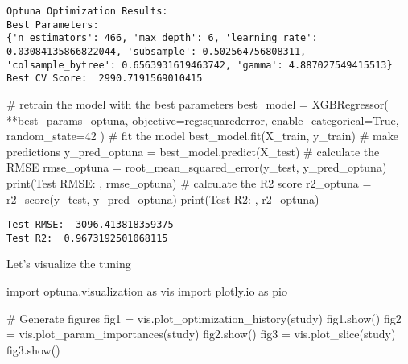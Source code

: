 \documentclass[
  letterpaper,
  DIV=11,
  numbers=noendperiod]{scrreprt}
\newenvironment{Shaded}{\begin{snugshade}}{\end{snugshade}}
\newcommand{\BuiltInTok}[1]{\textcolor[rgb]{0.00,0.23,0.31}{#1}}
\newcommand{\CommentTok}[1]{\textcolor[rgb]{0.37,0.37,0.37}{#1}}
\newcommand{\DecValTok}[1]{\textcolor[rgb]{0.68,0.00,0.00}{#1}}
\newcommand{\ImportTok}[1]{\textcolor[rgb]{0.00,0.46,0.62}{#1}}
\newcommand{\NormalTok}[1]{\textcolor[rgb]{0.00,0.23,0.31}{#1}}
\newcommand{\OperatorTok}[1]{\textcolor[rgb]{0.37,0.37,0.37}{#1}}
\newcommand{\StringTok}[1]{\textcolor[rgb]{0.13,0.47,0.30}{#1}}
\newcommand{\VariableTok}[1]{\textcolor[rgb]{0.07,0.07,0.07}{#1}}
\begin{document}
\begin{verbatim}
Optuna Optimization Results: 
Best Parameters: 
{'n_estimators': 466, 'max_depth': 6, 'learning_rate': 0.03084135866822044, 'subsample': 0.502564756808311, 'colsample_bytree': 0.6563931619463742, 'gamma': 4.887027549415513}
Best CV Score:  2990.7191569010415
\end{verbatim}

\begin{Shaded}
\begin{Highlighting}[]
\CommentTok{\# retrain the model with the best parameters}
\NormalTok{best\_model }\OperatorTok{=}\NormalTok{ XGBRegressor(}
    \OperatorTok{**}\NormalTok{best\_params\_optuna,}
\NormalTok{    objective}\OperatorTok{=}\StringTok{\textquotesingle{}reg:squarederror\textquotesingle{}}\NormalTok{,}
\NormalTok{    enable\_categorical}\OperatorTok{=}\VariableTok{True}\NormalTok{,}
\NormalTok{    random\_state}\OperatorTok{=}\DecValTok{42}
\NormalTok{)}
\CommentTok{\# fit the model}
\NormalTok{best\_model.fit(X\_train, y\_train)}
\CommentTok{\# make predictions}
\NormalTok{y\_pred\_optuna }\OperatorTok{=}\NormalTok{ best\_model.predict(X\_test)}
\CommentTok{\# calculate the RMSE}
\NormalTok{rmse\_optuna }\OperatorTok{=}\NormalTok{ root\_mean\_squared\_error(y\_test, y\_pred\_optuna)}
\BuiltInTok{print}\NormalTok{(}\StringTok{\textquotesingle{}Test RMSE: \textquotesingle{}}\NormalTok{, rmse\_optuna)}
\CommentTok{\# calculate the R2 score}
\NormalTok{r2\_optuna }\OperatorTok{=}\NormalTok{ r2\_score(y\_test, y\_pred\_optuna)}
\BuiltInTok{print}\NormalTok{(}\StringTok{\textquotesingle{}Test R2: \textquotesingle{}}\NormalTok{, r2\_optuna)}
\end{Highlighting}
\end{Shaded}

\begin{verbatim}
Test RMSE:  3096.413818359375
Test R2:  0.9673192501068115
\end{verbatim}

Let's visualize the tuning

\begin{Shaded}
\begin{Highlighting}[]
\ImportTok{import}\NormalTok{ optuna.visualization }\ImportTok{as}\NormalTok{ vis}
\ImportTok{import}\NormalTok{ plotly.io }\ImportTok{as}\NormalTok{ pio}

\CommentTok{\# Generate figures}
\NormalTok{fig1 }\OperatorTok{=}\NormalTok{ vis.plot\_optimization\_history(study)}
\NormalTok{fig1.show()}
\NormalTok{fig2 }\OperatorTok{=}\NormalTok{ vis.plot\_param\_importances(study)}
\NormalTok{fig2.show()}
\NormalTok{fig3 }\OperatorTok{=}\NormalTok{ vis.plot\_slice(study)}
\NormalTok{fig3.show()}


\end{Highlighting}
\end{Shaded}
\end{document}
